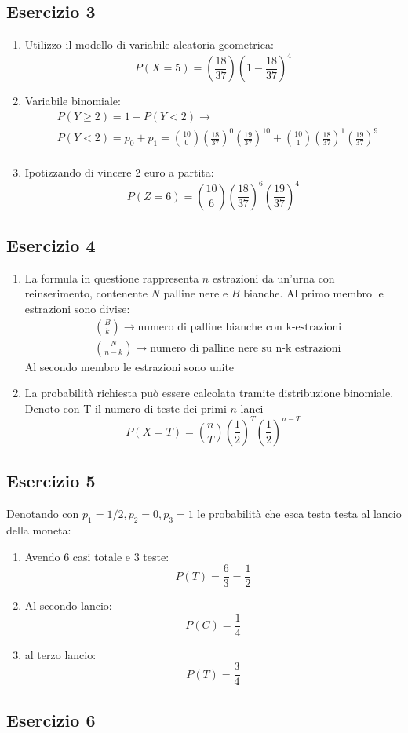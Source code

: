 \documentclass[12pt]{article}
\begin{document}
\subsection*{Esercizio 3}
\begin{enumerate}
    \item Utilizzo il modello di variabile aleatoria geometrica:
    \[
        P(X=5) = \left(\frac{18}{37}\right)\left(1-\frac{18}{37}\right)^{4}
    \]
    \item Variabile binomiale:
    \begin{align*}
        &P(Y \ge 2) = 1 - P(Y < 2) \rightarrow \\
        &P(Y<2) = p_0+p_1 = \binom{10}{0}\left(\frac{18}{37}\right)^0\left(\frac{19}{37}\right)^{10} + \binom{10}{1}\left(\frac{18}{37}\right)^1\left(\frac{19}{37}\right)^9\\
    \end{align*}
    \item Ipotizzando di vincere 2 euro a partita:
    \[
    P(Z = 6) = \binom{10}{6}\left(\frac{18}{37}\right)^6\left(\frac{19}{37}\right)^4    
    \]
\end{enumerate}

\subsection*{Esercizio 4}
\begin{enumerate}
    \item La formula in questione rappresenta \(n\) estrazioni da un'urna con reinserimento,
    contenente \(N\) palline nere e \(B\) bianche. Al primo membro le estrazioni sono divise:
    \begin{align*}
        &\binom{B}{k} \rightarrow \text{numero di palline bianche con k-estrazioni} \\
        &\binom{N}{n-k} \rightarrow \text{numero di palline nere su n-k estrazioni}
    \end{align*}
    Al secondo membro le estrazioni sono unite
    \item La probabilità richiesta può essere calcolata tramite distribuzione binomiale.
    Denoto con T il numero di teste dei primi \(n\) lanci
    \[
    P(X=T) = \binom{n}{T} \left( \frac{1}{2} \right)^T \left( \frac{1}{2} \right)^{n-T}  
    \]       
\end{enumerate}

\subsection*{Esercizio 5}
Denotando con \(p_1 = 1/2,p_2 = 0,p_3 = 1\) le probabilità che esca testa testa al lancio della moneta:
\begin{enumerate}
    \item Avendo 6 casi totale e 3 teste:
    \[
    P(T) = \frac{6}{3} = \frac{1}{2}    
    \]
    \item Al secondo lancio:
    \[
    P(C) = \frac{1}{4}    
    \]
    \item al terzo lancio:
    \[
    P(T) = \frac{3}{4}    
    \]
\end{enumerate}
\subsection*{Esercizio 6}
\end{document}
